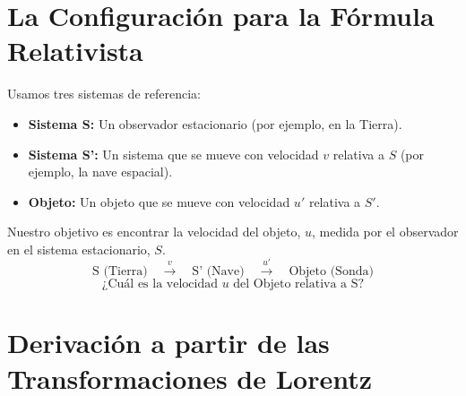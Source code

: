 \documentclass[11pt,a4paper]{article}
\begin{document}
\section{La Configuración para la Fórmula Relativista}

Usamos tres sistemas de referencia:
\begin{itemize}
    \item \textbf{Sistema S:} Un observador estacionario (por ejemplo, en la Tierra).
    \item \textbf{Sistema S':} Un sistema que se mueve con velocidad $v$ relativa a $S$ (por ejemplo, la nave espacial).
    \item \textbf{Objeto:} Un objeto que se mueve con velocidad $u'$ relativa a $S'$.
\end{itemize}
Nuestro objetivo es encontrar la velocidad del objeto, \textbf{$u$}, medida por el observador en el sistema estacionario, $S$.
\[
\text{S (Tierra)} \quad \xrightarrow{v} \quad \text{S' (Nave)} \quad \xrightarrow{u'} \quad \text{Objeto (Sonda)}
\]
\[
\text{¿Cuál es la velocidad } u \text{ del Objeto relativa a S?}
\]

\section{Derivación a partir de las Transformaciones de Lorentz}
\end{document}
